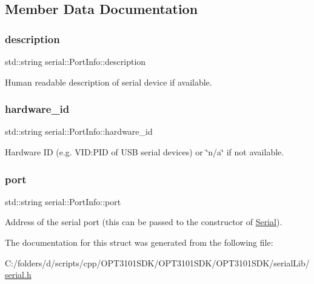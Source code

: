 \subsection{Member Data Documentation}
\mbox{\label{structserial_1_1_port_info_a2ba37dd33d47b554aef5c15c1fe8b872}} 
\subsubsection{\texorpdfstring{description}{description}}
{\footnotesize\ttfamily std\+::string serial\+::\+Port\+Info\+::description}

Human readable description of serial device if available. \mbox{\label{structserial_1_1_port_info_a7d55368e1a4e6ccc9da6f4d339524837}} 
\subsubsection{\texorpdfstring{hardware\+\_\+id}{hardware\_id}}
{\footnotesize\ttfamily std\+::string serial\+::\+Port\+Info\+::hardware\+\_\+id}

Hardware ID (e.\+g. V\+ID\+:P\+ID of U\+SB serial devices) or \char`\"{}n/a\char`\"{} if not available. \mbox{\label{structserial_1_1_port_info_a5d4242cdd6c0d01260e24964af4c23d2}} 
\subsubsection{\texorpdfstring{port}{port}}
{\footnotesize\ttfamily std\+::string serial\+::\+Port\+Info\+::port}

Address of the serial port (this can be passed to the constructor of \mbox{\hyperlink{classserial_1_1_serial}{Serial}}). 

The documentation for this struct was generated from the following file\+:\begin{DoxyCompactItemize}
\item 
C\+:/folders/d/scripts/cpp/\+O\+P\+T3101\+S\+D\+K/\+O\+P\+T3101\+S\+D\+K/\+O\+P\+T3101\+S\+D\+K/serial\+Lib/\mbox{\hyperlink{serial_8h}{serial.\+h}}\end{DoxyCompactItemize}
